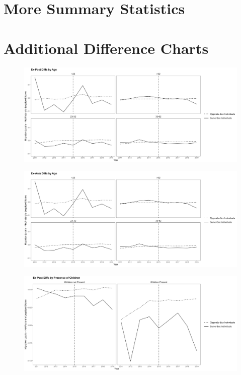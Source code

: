 \documentclass[12pt,letterpaper]{article}
\begin{document}
\newpage
\appendix
\FloatBarrier
\section{More Summary Statistics}



\begin{landscape}

\end{landscape}


\FloatBarrier
\newpage
\section{Additional Difference Charts}
\begin{figure}[h]
    \centering
    \includegraphics[width=0.75\linewidth]{outputs/summary_stats/age_post_diffs.png}
    \caption{}
    \label{}
\end{figure}

\begin{figure}[h]
    \centering
    \includegraphics[width=0.75\linewidth]{outputs/summary_stats/age_ante_diffs.png}
    \caption{}
    \label{fig: fig:enter-label}
\end{figure}


\begin{figure}[h]
    \centering
    \includegraphics[width=0.75\linewidth]{outputs/summary_stats/child_post_diffs.png}
    \caption{}
    \label{fig: fig:enter-label}
\end{figure}
\end{document}
